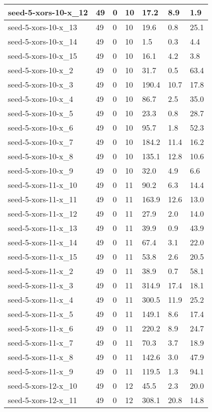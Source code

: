 \begin{scriptsize}
\begin{longtable}{|p{5cm}|l|l|l|l|l|l|}
seed-5-xors-10-x\_12&49&0&10&17.2&8.9&1.9 \\ \hline 
seed-5-xors-10-x\_13&49&0&10&19.6&0.8&25.1 \\ \hline 
seed-5-xors-10-x\_14&49&0&10&1.5&0.3&4.4 \\ \hline 
seed-5-xors-10-x\_15&49&0&10&16.1&4.2&3.8 \\ \hline 
seed-5-xors-10-x\_2&49&0&10&31.7&0.5&63.4 \\ \hline 
seed-5-xors-10-x\_3&49&0&10&190.4&10.7&17.8 \\ \hline 
seed-5-xors-10-x\_4&49&0&10&86.7&2.5&35.0 \\ \hline 
seed-5-xors-10-x\_5&49&0&10&23.3&0.8&28.7 \\ \hline 
seed-5-xors-10-x\_6&49&0&10&95.7&1.8&52.3 \\ \hline 
seed-5-xors-10-x\_7&49&0&10&184.2&11.4&16.2 \\ \hline 
seed-5-xors-10-x\_8&49&0&10&135.1&12.8&10.6 \\ \hline 
seed-5-xors-10-x\_9&49&0&10&32.0&4.9&6.6 \\ \hline 
seed-5-xors-11-x\_10&49&0&11&90.2&6.3&14.4 \\ \hline 
seed-5-xors-11-x\_11&49&0&11&163.9&12.6&13.0 \\ \hline 
seed-5-xors-11-x\_12&49&0&11&27.9&2.0&14.0 \\ \hline 
seed-5-xors-11-x\_13&49&0&11&39.9&0.9&43.9 \\ \hline 
seed-5-xors-11-x\_14&49&0&11&67.4&3.1&22.0 \\ \hline 
seed-5-xors-11-x\_15&49&0&11&53.8&2.6&20.5 \\ \hline 
seed-5-xors-11-x\_2&49&0&11&38.9&0.7&58.1 \\ \hline 
seed-5-xors-11-x\_3&49&0&11&314.9&17.4&18.1 \\ \hline 
seed-5-xors-11-x\_4&49&0&11&300.5&11.9&25.2 \\ \hline 
seed-5-xors-11-x\_5&49&0&11&149.1&8.6&17.4 \\ \hline 
seed-5-xors-11-x\_6&49&0&11&220.2&8.9&24.7 \\ \hline 
seed-5-xors-11-x\_7&49&0&11&70.3&3.7&18.9 \\ \hline 
seed-5-xors-11-x\_8&49&0&11&142.6&3.0&47.9 \\ \hline 
seed-5-xors-11-x\_9&49&0&11&119.5&1.3&94.1 \\ \hline 
seed-5-xors-12-x\_10&49&0&12&45.5&2.3&20.0 \\ \hline 
seed-5-xors-12-x\_11&49&0&12&308.1&20.8&14.8 \\ \hline 

\end{longtable}
\end{scriptsize}

